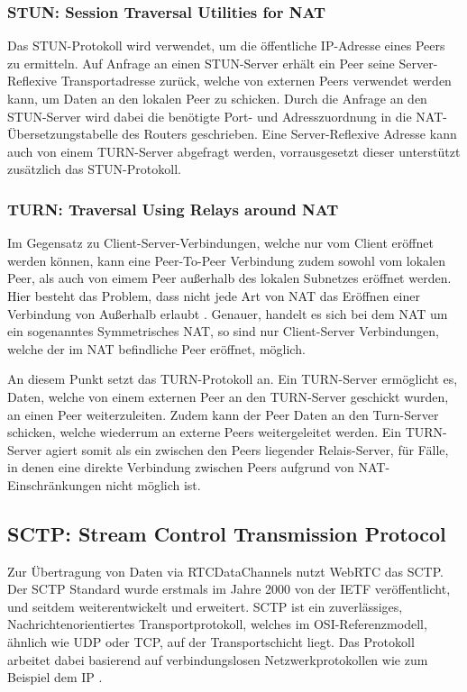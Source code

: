 \subsubsection{STUN: Session Traversal Utilities for NAT}
Das \acf{STUN}-Protokoll wird verwendet, um die öffentliche \acs{IP}-Adresse eines Peers zu ermitteln. Auf Anfrage an einen STUN-Server erhält ein Peer seine Server-Reflexive Transportadresse zurück, welche von externen Peers verwendet werden kann, um Daten an den lokalen Peer zu schicken. Durch die Anfrage an den \acs{STUN}-Server wird dabei die benötigte Port- und Adresszuordnung in die \acs{NAT}-Übersetzungstabelle des Routers geschrieben. Eine Server-Reflexive Adresse kann auch von einem TURN-Server abgefragt werden, vorrausgesetzt dieser unterstützt zusätzlich das \acs{STUN}-Protokoll.\par

\subsubsection{TURN: Traversal Using Relays around NAT}
Im Gegensatz zu Client-Server-Verbindungen, welche nur vom Client eröffnet werden können, kann eine Peer-To-Peer Verbindung zudem sowohl vom lokalen Peer, als auch von eimem Peer außerhalb des lokalen Subnetzes eröffnet werden. Hier besteht das Problem, dass nicht jede Art von \acs{NAT} das Eröffnen einer Verbindung von Außerhalb erlaubt \cite{natproblemsRFC}. Genauer, handelt es sich bei dem \acs{NAT} um ein sogenanntes \glqq{}Symmetrisches \acs{NAT}\grqq{}, so sind nur Client-Server Verbindungen, welche der im \acs{NAT} befindliche Peer eröffnet, möglich.\par

An diesem Punkt setzt das \acf{TURN}-Protokoll an. Ein \acs{TURN}-Server ermöglicht es, Daten, welche von einem externen Peer an den \acs{TURN}-Server geschickt wurden, an einen Peer weiterzuleiten. Zudem kann der Peer Daten an den Turn-Server schicken, welche wiederrum an externe Peers weitergeleitet werden. Ein TURN-Server agiert somit als ein zwischen den Peers liegender Relais-Server, für Fälle, in denen eine direkte Verbindung zwischen Peers aufgrund von \acs{NAT}-Einschränkungen nicht möglich ist.

\subsection{SCTP: Stream Control Transmission Protocol}
Zur Übertragung von Daten via RTCDataChannels nutzt \acs{WebRTC} das \acf{SCTP}. Der \acs{SCTP} Standard wurde erstmals im Jahre 2000 von der \acs{IETF} veröffentlicht, und seitdem weiterentwickelt und erweitert. \acs{SCTP} ist ein zuverlässiges, Nachrichtenorientiertes Transportprotokoll, welches im \acf{OSI}-Referenzmodell, ähnlich wie \acs{UDP} oder \acs{TCP}, auf der Transportschicht liegt. Das Protokoll arbeitet dabei basierend auf verbindungslosen Netzwerkprotokollen wie zum Beispiel dem \acf{IP} \cite{sctpRFC}.\par


